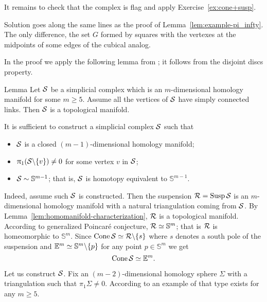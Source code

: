 It remains to check that the complex is flag 
and apply Exercise~\ref{ex:cone+susp}.

Solution goes along the same lines as the proof of Lemma~\ref{lem:example-pi_infty}.
The only difference, the set $G$ formed by squares with the vertexes at the  midpoints of some edges of the cubical analog. 

In the proof we apply the following lemma from \cite{edwards}; 
it follows from the disjoint discs property.


\begin{thm}{Lemma}\label{lem:homomanifold-characterization}
Let $\mathcal{S}$ be a simplicial complex which 
is an $m$-dimensional homology manifold for some $m\ge 5$.
Assume all the vertices of
$\mathcal{S}$ have simply connected links.
Then $\mathcal{S}$ is a topological manifold.
\end{thm}


It is sufficient to construct a simplicial complex $\mathcal{S}$
such that 
\begin{itemize}
\item $\mathcal{S}$ is a closed $(m-1)$-dimensional homology manifold;
\item $\uppi_1(\mathcal{S}\backslash\{v\})\ne0$ for some vertex $v$ in $\mathcal{S}$;
\item $\mathcal{S}\sim \mathbb{S}^{m-1}$; that is, $\mathcal{S}$ is homotopy equivalent to $\mathbb{S}^{m-1}$.
\end{itemize}

Indeed, assume such $\mathcal{S}$ is constructed.
Then the suspension
$\spc{R}\z=\Susp\spc{S}$
is an $m$-dimensional homology manifold with a natural triangulation coming from $\mathcal{S}$.
By Lemma~\ref{lem:homomanifold-characterization},
$\mathcal{R}$ is a topological manifold.
According to generalized Poincar\'{e} conjecture,
$\mathcal{R}\simeq\mathbb{S}^m$;
that is
$\mathcal{R}$ is homeomorphic to $\mathbb{S}^m$.
Since $\mathop{\rm Cone}\nolimits \mathcal{S}\simeq \mathcal{R}\backslash\{s\}$ where $s$ denotes a south pole of the suspension 
and $\mathbb{E}^m\simeq \mathbb{S}^m\backslash\{p\}$
for any point $p\in \mathbb{S}^m$
we get 
\[\mathop{\rm Cone}\nolimits \mathcal{S}\simeq\mathbb{E}^m.\]

Let us construct $\mathcal{S}$.
Fix an $(m-2)$-dimensional homology sphere $\Sigma$ with a triangulation such that $\pi_1\Sigma\ne0$.
According to \cite{kervaire} %
an example of that type exists for any $m\ge 5$.

